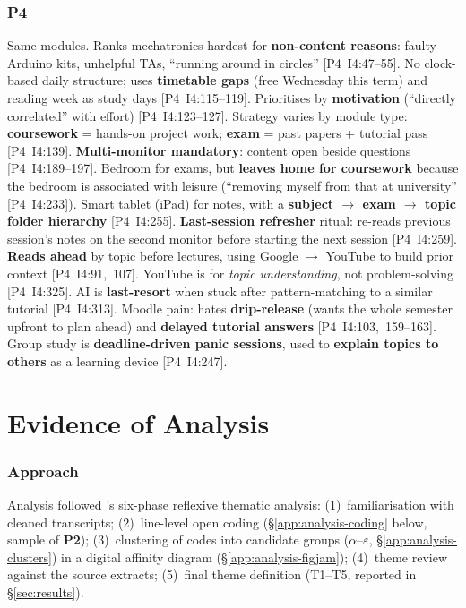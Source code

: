 \documentclass[a4paper,11pt]{article}
\begin{document}
\subsubsection*{P4}
Same modules. Ranks mechatronics hardest for \textbf{non-content
reasons}: faulty Arduino kits, unhelpful TAs, ``running around in
circles'' [P4~I4:47--55]. No clock-based daily structure; uses
\textbf{timetable gaps} (free Wednesday this term) and reading week as
study days [P4~I4:115--119]. Prioritises by \textbf{motivation}
(``directly correlated'' with effort) [P4~I4:123--127]. Strategy varies
by module type: \textbf{coursework} = hands-on project work;
\textbf{exam} = past papers + tutorial pass [P4~I4:139].
\textbf{Multi-monitor mandatory}: content open beside questions
[P4~I4:189--197]. Bedroom for exams, but \textbf{leaves home for
coursework} because the bedroom is associated with leisure (``removing
myself from that at university'' [P4~I4:233]). Smart tablet (iPad) for
notes, with a \textbf{subject $\rightarrow$ exam $\rightarrow$ topic
folder hierarchy} [P4~I4:255]. \textbf{Last-session refresher} ritual:
re-reads previous session's notes on the second monitor before starting
the next session [P4~I4:259]. \textbf{Reads ahead} by topic before
lectures, using Google $\rightarrow$ YouTube to build prior context
[P4~I4:91,~107]. YouTube is for \emph{topic understanding}, not
problem-solving [P4~I4:325]. AI is \textbf{last-resort} when stuck after
pattern-matching to a similar tutorial [P4~I4:313]. Moodle pain: hates
\textbf{drip-release} (wants the whole semester upfront to plan ahead)
and \textbf{delayed tutorial answers} [P4~I4:103,~159--163]. Group
study is \textbf{deadline-driven panic sessions}, used to
\textbf{explain topics to others} as a learning device [P4~I4:247].

\newpage
\section{Evidence of Analysis}\label{app:analysis}

\subsubsection*{Approach}
Analysis followed \textcite{braun2006}'s six-phase reflexive thematic
analysis: (1)~familiarisation with cleaned transcripts; (2)~line-level
open coding (\S\ref{app:analysis-coding} below, sample of
\textbf{P2}); (3)~clustering of codes into candidate groups
($\alpha$--$\varepsilon$, \S\ref{app:analysis-clusters}) in a digital
affinity diagram (\S\ref{app:analysis-figjam}); (4)~theme review
against the source extracts; (5)~final theme definition (T1--T5,
reported in \S\ref{sec:results}).
\end{document}
